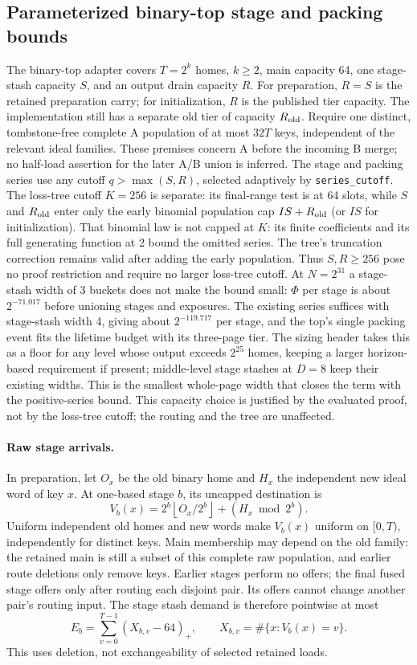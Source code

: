 \documentclass[11pt]{article}
\theoremstyle{definition}
\theoremstyle{remark}
\begin{document}
\subsection{Parameterized binary-top stage and packing bounds}
\label{sec:binary-top-preparation}
The binary-top adapter covers $T=2^k$ homes, $k\ge2$, main capacity 64,
one stage-stash capacity $S$, and an output drain capacity $R$.
For preparation, $R=S$ is the retained preparation carry; for
initialization, $R$ is the published tier capacity. The implementation still
has a separate old tier of capacity $R_{\rm old}$. Require one distinct,
tombstone-free complete A population of at most $32T$ keys, independent
of the relevant ideal families. These premises concern A before the
incoming B merge; no half-load assertion for the later A/B union is inferred.
The stage and packing series use any cutoff $q>\max(S,R)$, selected
adaptively by \texttt{series\_cutoff}. The loss-tree cutoff $K=256$ is
separate: its final-range test is at 64 slots, while $S$ and $R_{\rm old}$
enter only the early binomial population cap $IS+R_{\rm old}$ (or $IS$
for initialization). That binomial law is not capped at $K$: its finite
coefficients and its full generating function at 2 bound the omitted
series. The tree's truncation correction remains valid after adding the
early population. Thus $S,R\ge256$ pose no proof restriction and require
no larger loss-tree cutoff. At $N=2^{31}$ a stage-stash width of 3 buckets
does not make the bound small: $\Phi$ per stage is about
$2^{-71.017}$ before unioning stages and exposures. The existing series
suffices with stage-stash width 4, giving about $2^{-119.717}$ per stage,
and the top's single packing event fits the lifetime budget with its
three-page tier. The sizing header takes this as a floor for any level
whose output exceeds $2^{25}$ homes, keeping a larger horizon-based
requirement if present; middle-level stage stashes at $D=8$ keep their
existing widths. This is the smallest whole-page width that closes the
term with the positive-series bound. This capacity choice is justified by
the evaluated proof, not by the loss-tree cutoff; the routing and the tree
are unaffected.

\paragraph{Raw stage arrivals.}
In preparation, let $O_x$ be the old binary home and $H_x$ the independent
new ideal word of key $x$. At one-based stage $b$, its uncapped destination is
\[
 V_b(x)=2^b\left\lfloor O_x/2^b\right\rfloor+(H_x\bmod2^b).
\]
Uniform independent old homes and new words make $V_b(x)$ uniform on
$[0,T)$, independently for distinct keys. Main membership may depend on
the old family: the retained main is still a subset of this complete raw
population, and earlier route deletions only remove keys. Earlier stages
perform no offers; the final fused stage offers only after routing each
disjoint pair. Its offers cannot change another pair's routing input.
The stage stash demand is therefore pointwise at most
\[
 E_b=\sum_{v=0}^{T-1}(X_{b,v}-64)_+,
 \qquad X_{b,v}=\#\{x:V_b(x)=v\}.
\]
This uses deletion, not exchangeability of selected retained loads.
\end{document}
